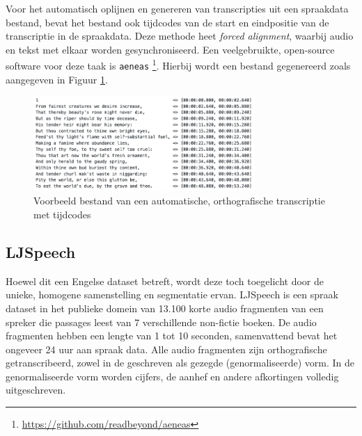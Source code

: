 Voor het automatisch oplijnen en genereren van transcripties uit een spraakdata bestand, bevat het bestand ook tijdcodes van de start en eindpositie van de transcriptie in de spraakdata. Deze methode heet \textit{forced alignment}, waarbij audio en tekst met elkaar worden gesynchroniseerd. Een veelgebruikte, open-source software voor deze taak is \texttt{aeneas} \footnote{\url{https://github.com/readbeyond/aeneas}}. Hierbij wordt een bestand gegenereerd zoals aangegeven in Figuur \ref{fig:aenas}. 

\begin{table}[]
    \centering
    \caption{Kolommen van een orthografisch transcriptie bestand}
    \label{tab:orthografische_file}
\end{table}

\begin{figure}
    \centering
    \includegraphics[width=0.75\textwidth]{figures/transcription.png}
    \caption{Voorbeeld bestand van een automatische, orthografische transcriptie met tijdcodes}
    \label{fig:aenas}
\end{figure}


\subsection{LJSpeech}
Hoewel dit een Engelse dataset betreft, wordt deze toch toegelicht door de unieke, homogene samenstelling en segmentatie ervan. LJSpeech is een spraak dataset in het publieke domein van 13.100 korte audio fragmenten van een spreker die passages leest van 7 verschillende non-fictie boeken. De audio fragmenten hebben een lengte van 1 tot 10 seconden, samenvattend bevat het ongeveer 24 uur aan spraak data. Alle audio fragmenten zijn orthografische getranscribeerd, zowel in de geschreven als gezegde (genormaliseerde) vorm. In de genormaliseerde vorm worden cijfers, de aanhef en andere afkortingen volledig uitgeschreven.

